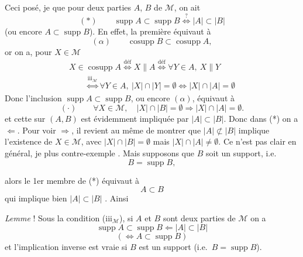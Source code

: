 \documentclass[11pt,a4paper]{article}
\begin{document}
Ceci posé, je   que pour deux parties $A$, $B$ de $\mathcal{M}$, on ait
\[
  (*) \qquad \operatorname{supp} A \subset \operatorname{supp} B \overset{?}{\iff} |A| \subset |B|
\]
(ou encore $A \subset \operatorname{supp} B$). En effet,  la première \struck{\ill{}}  équivaut à
\[
  (\alpha) \qquad \operatorname{cosupp} B \subset \operatorname{cosupp} A ,
\]
or  on a, pour $X \in \mathcal{M}$
\[
  \begin{array}{l}
  X \in \operatorname{cosupp} A \overset{\mathrm{déf}}{\iff} X \parallel A \overset{\mathrm{déf}}{\iff} \forall Y \in A,\ X \parallel Y \\
  \qquad \overset{\mathrm{iii}_{\mathcal{M}}}{\iff} \forall Y \in A,\ |X| \cap |Y| = \emptyset \iff |X| \cap |A| = \emptyset
  \end{array}
\]
Donc l'inclusion $\operatorname{supp} A \subset \operatorname{supp} B$, ou encore $(\alpha)$, équivaut à
\[
  (\cdot) \qquad \forall X \in \mathcal{M}, \quad |X| \cap |B| = \emptyset \Longrightarrow |X| \cap |A| = \emptyset .
\]
et cette  \struck{\ill{}} sur $(A, B)$ est évidemment impliquée par $|A| \subset |B|$. Donc dans (*) on a $\Leftarrow$. Pour voir $\Rightarrow$, il revient au même de montrer que  $|A| \not\subset |B|$ implique l'existence de $X \in \mathcal{M}$, avec $|X| \cap |B| = \emptyset$ mais $|X| \cap |A| \neq \emptyset$. Ce n'est pas clair en général,  je  plus   contre-exemple . Mais supposons que $B$ soit un support, i.e.\ 
\[
  B = \operatorname{supp} B ,
\]

alors le 1er membre de (*) \struck{\ill{}} équivaut à
\[
  A \subset B
\]
qui implique bien $|A| \subset |B|$ . Ainsi

\emph{Lemme} ! Sous la  condition (iii$_{\mathcal{M}}$), si $A$ et $B$ sont deux parties de $\mathcal{M}$ on a
\[
  \operatorname{supp} A \subset \operatorname{supp} B \Longleftarrow |A| \subset |B|
\]
\[
  (\Leftrightarrow A \subset \operatorname{supp} B)
\]
et l'implication inverse est vraie si $B$ est un support (i.e.\ $B = \operatorname{supp} B$).
\end{document}
